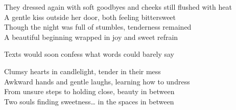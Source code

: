 \begin{lyrics}
They dressed again with soft goodbyes and cheeks still flushed with heat\\  
A gentle kiss outside her door, both feeling bittersweet\\  
Though the night was full of stumbles, tenderness remained\\  
A beautiful beginning wrapped in joy and sweet refrain  

Texts would soon confess what words could barely say  

Clumsy hearts in candlelight, tender in their mess\\  
Awkward hands and gentle laughs, learning how to undress\\  
From unsure steps to holding close, beauty in between\\  
Two souls finding sweetness… in the spaces in between
\end{lyrics}

